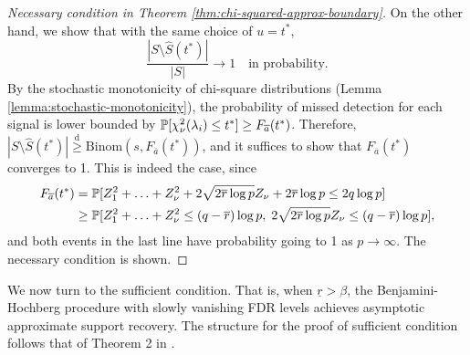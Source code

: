 \begin{proof}[Necessary condition in Theorem \ref{thm:chi-squared-approx-boundary}]
On the other hand, we show that with the same choice of $u = t^*$,
\begin{equation} \label{eq:approx-boundary-proof-converse-4}
    \frac{|{S}\setminus\widehat{S}(t^*)|}{|{S}|}\to 1 \quad \text{in probability}.
\end{equation}
By the stochastic monotonicity of chi-square distributions (Lemma \ref{lemma:stochastic-monotonicity}), the probability of missed detection for each signal is lower bounded by $\P[\chi^2_\nu(\lambda_i) \le t^*] \ge F_{\overline{a}}(t^*)$.
Therefore, $|{S}\setminus\widehat{S}(t^*)| \stackrel{\mathrm{d}}{\ge} \text{Binom}(s, {F_{\overline{a}}}(t^*))$, and it suffices to show that ${F_{\overline{a}}}(t^*)$ converges to 1.
This is indeed the case, since
\begin{align*}
    {F_{\overline{a}}}(t^*) 
    &= \P[Z_1^2 + \ldots + Z_\nu^2 + 2\sqrt{2\overline{r}\log{p}} Z_\nu + 2\overline{r}\log{p} \le 2q\log{p}] \\
    &\ge \P[Z_1^2 + \ldots + Z_\nu^2 \le (q-\overline{r})\log{p}, \; 2\sqrt{2\overline{r}\log{p}} Z_\nu \le (q-\overline{r})\log{p}],
\end{align*}
and both events in the last line have probability going to 1 as $p\to\infty$.
The necessary condition is shown.
\end{proof}

We now turn to the sufficient condition. 
That is, when $\underline{r} > \beta$, the Benjamini-Hochberg procedure with slowly vanishing FDR levels achieves asymptotic approximate support recovery.
The structure for the proof of sufficient condition follows that of Theorem 2 in \cite{arias2017distribution}. 

